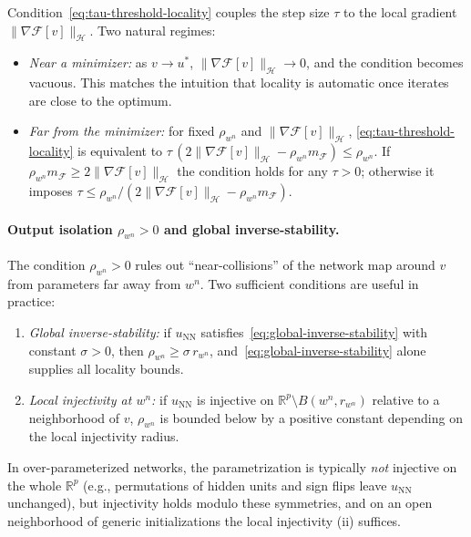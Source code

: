 \documentclass[twoside,11pt]{article}
\newcommand{\R}{\mathbb{R}}
\newcommand{\NN}{\mathrm{NN}}
\newcommand{\calF}{\mathcal{F}}
\newcommand{\calH}{\mathcal{H}}
\begin{document}
\begin{remark}\label{rem:rho-positive}
Condition~\eqref{eq:tau-threshold-locality} couples the step size $\tau$ to the local gradient $\|\nabla\calF[v]\|_\calH$. Two natural regimes:
\begin{itemize}
\item \emph{Near a minimizer:} as $v\to u^*$, $\|\nabla\calF[v]\|_\calH\to 0$, and the condition becomes vacuous. This matches the intuition that locality is automatic once iterates are close to the optimum.
\item \emph{Far from the minimizer:} for fixed $\rho_{w^n}$ and $\|\nabla\calF[v]\|_\calH$, \eqref{eq:tau-threshold-locality} is equivalent to $\tau\,(2\|\nabla\calF[v]\|_\calH-\rho_{w^n}m_\calF)\le \rho_{w^n}$. If $\rho_{w^n}m_\calF\ge 2\|\nabla\calF[v]\|_\calH$ the condition holds for any $\tau>0$; otherwise it imposes $\tau\le \rho_{w^n}/(2\|\nabla\calF[v]\|_\calH-\rho_{w^n}m_\calF)$.
\end{itemize}

\paragraph{Output isolation $\rho_{w^n}>0$ and global inverse-stability.}
The condition $\rho_{w^n}>0$ rules out ``near-collisions'' of the network map around $v$ from parameters far away from $w^n$. Two sufficient conditions are useful in practice:
\begin{enumerate}[label=\textnormal{(i)},leftmargin=*,nosep]
\item \emph{Global inverse-stability:} if $u_\NN$ satisfies~\eqref{eq:global-inverse-stability} with constant $\sigma>0$, then $\rho_{w^n}\ge\sigma\,r_{w^n}$, and~\eqref{eq:global-inverse-stability} alone supplies all locality bounds.
\item \emph{Local injectivity at $w^n$:} if $u_\NN$ is injective on $\R^p\setminus B(w^n,r_{w^n})$ relative to a neighborhood of $v$, $\rho_{w^n}$ is bounded below by a positive constant depending on the local injectivity radius.
\end{enumerate}
In over-parameterized networks, the parametrization is typically \emph{not} injective on the whole $\R^p$ (e.g., permutations of hidden units and sign flips leave $u_\NN$ unchanged), but injectivity holds modulo these symmetries, and on an open neighborhood of generic initializations the local injectivity (ii) suffices.


\end{remark}
\end{document}
